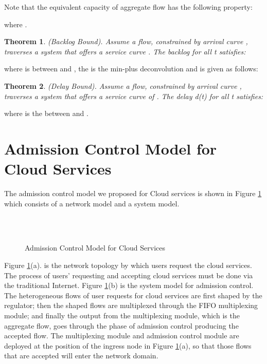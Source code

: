\documentclass[a4paper]{article}
\newtheorem{theorem}{Theorem}
\begin{document}
Note that the equivalent capacity of aggregate flow has the following property:



\noindent where .

\begin{theorem}
(Backlog Bound). Assume a flow, constrained by arrival curve , traverses a system that offers a service curve . The backlog  for all t satisfies:



\end{theorem}

\noindent where  is   between  and , the  is the min-plus deconvolution and is given as follows:



\begin{theorem}
(Delay Bound). Assume a flow, constrained by arrival curve , traverses a system that offers a service curve of . The  delay d(t) for all t satisfies:



\end{theorem}

\noindent where  is the   between  and .

\section{Admission Control Model for Cloud Services}

The admission control model we proposed for Cloud services is shown in Figure \ref{fig1} which consists of a network model and a system model.

\begin{figure}[h]
\centering
{}\\
\\
\caption{Admission Control Model for Cloud Services}
\label{fig1}
\end{figure}

Figure \ref{fig1}(a). is the network topology by which users request the cloud services. The process of users’ requesting and accepting cloud services must be done via the traditional Internet. Figure \ref{fig1}(b) is the system model for admission control. The heterogeneous flows of user requests for cloud services are first shaped by the regulator; then the shaped flows are multiplexed through the FIFO multiplexing module; and finally the output from the multiplexing module, which is the aggregate flow, goes through the phase of admission control producing the accepted flow. The multiplexing module and admission control module are deployed at the position of the ingress node in Figure \ref{fig1}(a), so that those flows that are accepted will enter the network domain.
\end{document}
